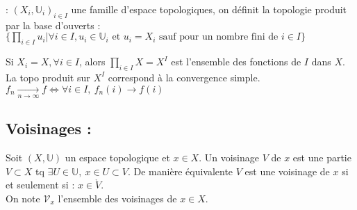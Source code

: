 \begin{ex}: $(X_i,\mathbb{U}_i)_{i\in I}$ une famille d'espace topologiques, on définit la topologie produit par la base d'ouverts : \\
     $\{\prod\limits_{i\in I}u_i|\forall i\in I, u_i\in \mathbb{U}_i \text{ et }u_i=X_i \text{ sauf pour un nombre fini de } i\in I \}$
\end{ex}
\begin{ex}
    Si $X_i=X, \forall i\in I$, alors $\prod\limits_{i\in I}X=X^I$ est l'ensemble des fonctions de $I$ dans $X$. La topo produit sur $X^I$ correspond à la convergence simple. $f_n\underset{n\to \infty }{\longrightarrow} f\Leftrightarrow \forall i\in I,\ f_n(i)\to f(i)$
\end{ex}

\subsection{ Voisinages :}
\begin{definition}[Voisinage]
    Soit $(X,\mathbb{U})$ un espace topologique et $x\in X$. Un voisinage $V$ de $x$ est une partie $V\subset X$ tq $\exists U\in \mathbb{U},\ x\in U \subset V$. De manière équivalente $V$ est une voisinage de $x$ si et seulement si : $x \in \mathring{V}$.\\
     On note $\mathcal{V}_x$ l'ensemble des voisinages de $x\in X$.
\end{definition}

